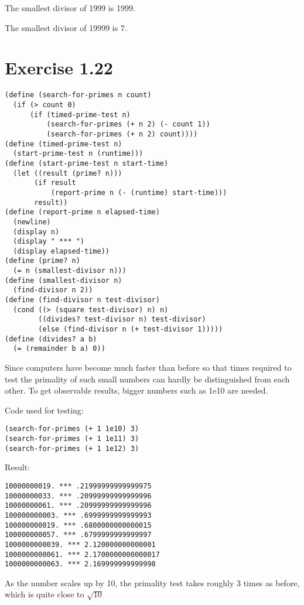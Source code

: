 \documentclass[../main.tex]{subfiles}
\begin{document}
The smallest divisor of 1999 is 1999.

The smallest divisor of 19999 is 7.

\section{Exercise 1.22}

\begin{lstlisting}
(define (search-for-primes n count)
  (if (> count 0)
      (if (timed-prime-test n)
          (search-for-primes (+ n 2) (- count 1))
          (search-for-primes (+ n 2) count))))
(define (timed-prime-test n)
  (start-prime-test n (runtime)))
(define (start-prime-test n start-time)
  (let ((result (prime? n)))
       (if result
           (report-prime n (- (runtime) start-time)))
       result))
(define (report-prime n elapsed-time)
  (newline)
  (display n)
  (display " *** ")
  (display elapsed-time))
(define (prime? n)
  (= n (smallest-divisor n)))
(define (smallest-divisor n)
  (find-divisor n 2))
(define (find-divisor n test-divisor)
  (cond ((> (square test-divisor) n) n)
        ((divides? test-divisor n) test-divisor)
        (else (find-divisor n (+ test-divisor 1)))))
(define (divides? a b)
  (= (remainder b a) 0))
\end{lstlisting}

Since computers have become much faster than before so that
 times required to test the primality of such small numbers
 can hardly be distinguished from each other. To get observable
 results, bigger numbers such as 1e10 are needed.

Code used for testing:

\begin{lstlisting}
(search-for-primes (+ 1 1e10) 3)
(search-for-primes (+ 1 1e11) 3)
(search-for-primes (+ 1 1e12) 3)
\end{lstlisting}

Result:

\begin{lstlisting}
10000000019. *** .21999999999999975
10000000033. *** .20999999999999996
10000000061. *** .20999999999999996
100000000003. *** .6999999999999993
100000000019. *** .6800000000000015
100000000057. *** .6799999999999997
1000000000039. *** 2.120000000000001
1000000000061. *** 2.1700000000000017
1000000000063. *** 2.169999999999998
\end{lstlisting}

As the number scales up by 10, the primality
 test takes roughly 3 times as before, which is
 quite close to $\sqrt{10}$
\end{document}
